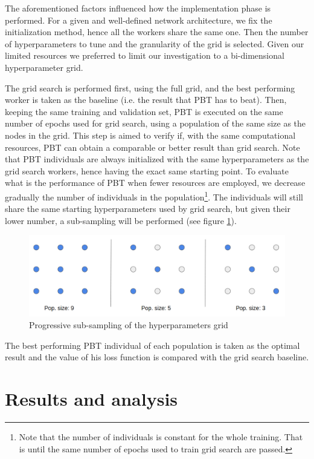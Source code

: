 \documentclass{article}
\begin{document}
The aforementioned factors influenced how the implementation phase is performed. For a given and well-defined network architecture, we fix the initialization method, hence all the workers share the same one. Then the number of hyperparameters to tune and the granularity of the grid is selected. Given our limited resources we preferred to limit our investigation to a bi-dimensional hyperparameter grid.

The grid search is performed first, using the full grid, and the best performing worker is taken as the baseline (i.e. the result that PBT has to beat). Then, keeping the same training and validation set, PBT is executed on the same number of epochs used for grid search, using a population of the same size as the nodes in the grid. This step is aimed to verify if, with the same computational resources, PBT can obtain a comparable or better result than grid search. Note that PBT individuals are always initialized with the same hyperparameters as the grid search workers, hence having the exact same starting point. To evaluate what is the performance of PBT when fewer resources are employed, we decrease gradually the number of individuals in the population\footnote{Note that the number of individuals is constant for the whole training. That is until the same number of epochs used to train grid search are passed.}. The individuals will still share the same starting hyperparameters used by grid search, but given their lower number, a sub-sampling will be performed (see figure \ref{fig:subsampling}).

\begin{figure}[H]
    \label{fig:subsampling}
    \centering
    \includegraphics[width=\textwidth,height=\textheight,keepaspectratio]{subsampling}
    \caption{Progressive sub-sampling of the hyperparameters grid}
\end{figure}

The best performing PBT individual of each population is taken as the optimal result and the value of his loss function is compared with the grid search baseline.

\section{Results and analysis}
\label{sec:results}
\end{document}
